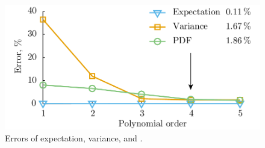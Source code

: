 \begin{figure}
  \centering
  \includegraphics[width=0.9\columnwidth]{include/assets/accuracy.pdf}
  \caption{Errors of expectation, variance, and \pdf.}
  \vspace{-1.6em}
\end{figure}
